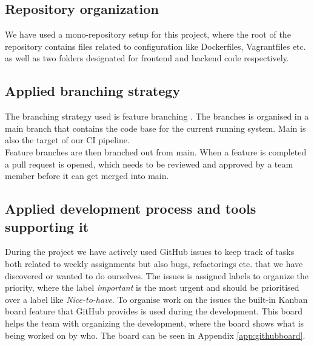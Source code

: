 \subsection{Repository organization}
We have used a mono-repository setup for this project, where the root of the repository contains files related to configuration like Dockerfiles, Vagrantfiles etc. as well as two folders designated for frontend and backend code respectively.

\subsection{Applied branching strategy}
The branching strategy used is feature branching \cite{featurebranch}. The branches is organised in a main branch that contains the code base for the current running system. Main is also the target of our CI pipeline. \\
Feature branches are then branched out from main. When a feature is completed a pull request is opened, which needs to be reviewed and approved by a team member before it can get merged into main.

\subsection{Applied development process and tools supporting it}
During the project we have actively used GitHub issues to keep track of tasks both related to weekly assignments but also bugs, refactorings etc. that we have discovered or wanted to do ourselves. The issues is assigned labels to organize the priority, where the label \textit{important} is the most urgent and should be prioritised over a label like \textit{Nice-to-have}. To organise work on the issues the built-in Kanban board feature that GitHub provides is used during the development. This board helps the team with organizing the development, where the board shows what is being worked on by who. The board can be seen in Appendix \ref{app:githubboard}.   

